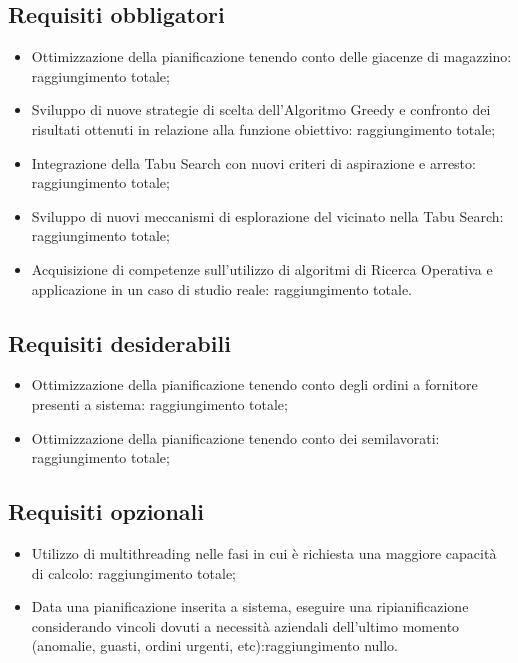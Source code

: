 \subsection{Requisiti obbligatori}
\begin{itemize}
	\item Ottimizzazione della pianificazione tenendo conto delle giacenze
	di magazzino: raggiungimento totale;
	\item Sviluppo di nuove strategie di scelta dell’Algoritmo Greedy e
	confronto dei risultati ottenuti in relazione alla funzione obiettivo: raggiungimento totale;
	\item Integrazione della Tabu Search con nuovi criteri di aspirazione e
	arresto: raggiungimento totale;
	\item Sviluppo di nuovi meccanismi di esplorazione del vicinato nella
	Tabu Search: raggiungimento totale;
	\item Acquisizione di competenze sull’utilizzo di algoritmi di Ricerca
	Operativa e applicazione in un caso di studio reale: raggiungimento totale.

	
\end{itemize}

\subsection{Requisiti desiderabili}
\begin{itemize}
	\item Ottimizzazione della pianificazione tenendo conto degli ordini a
	fornitore presenti a sistema: raggiungimento totale;
	\item Ottimizzazione della pianificazione tenendo conto dei
	semilavorati: raggiungimento totale;
\end{itemize}

\subsection{Requisiti opzionali}
\begin{itemize}
	\item Utilizzo di multithreading nelle fasi in cui è richiesta una maggiore
	capacità di calcolo: raggiungimento totale;
	\item Data una pianificazione inserita a sistema, eseguire una
	ripianificazione considerando vincoli dovuti a necessità aziendali
	dell’ultimo momento (anomalie, guasti, ordini urgenti, etc):raggiungimento nullo.
\end{itemize}

